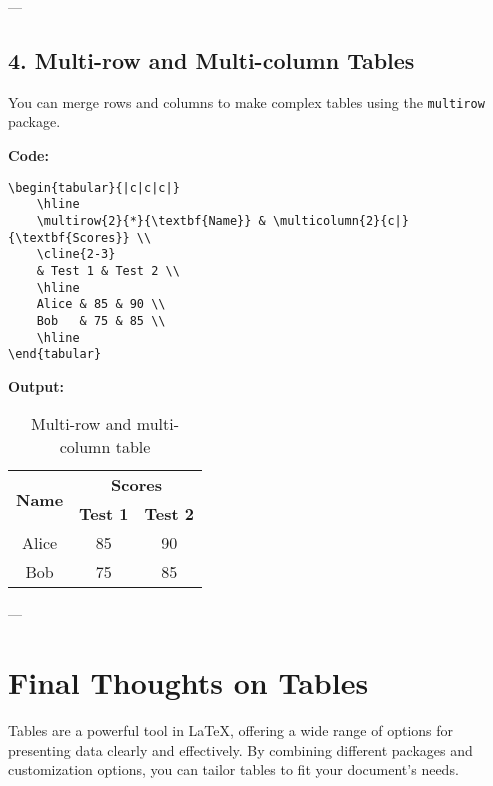 \documentclass{article}
\begin{document}
---

\subsection*{4. Multi-row and Multi-column Tables}

You can merge rows and columns to make complex tables using the \texttt{multirow} package.

\textbf{Code:}
\begin{verbatim}
\begin{tabular}{|c|c|c|}
    \hline
    \multirow{2}{*}{\textbf{Name}} & \multicolumn{2}{c|}{\textbf{Scores}} \\
    \cline{2-3}
    & Test 1 & Test 2 \\
    \hline
    Alice & 85 & 90 \\
    Bob   & 75 & 85 \\
    \hline
\end{tabular}
\end{verbatim}

\textbf{Output:}
\begin{table}[h]
    \centering
    \begin{tabular}{|c|c|c|}
        \hline
        \multirow{2}{*}{\textbf{Name}} & \multicolumn{2}{c|}{\textbf{Scores}} \\
        \cline{2-3}
                                       & \textbf{Test 1} & \textbf{Test 2} \\
        \hline
        Alice   & 85  & 90 \\
        Bob     & 75  & 85 \\
        \hline
    \end{tabular}
    \caption{Multi-row and multi-column table}
\end{table}

---

\section*{Final Thoughts on Tables}
Tables are a powerful tool in LaTeX, offering a wide range of options for presenting data clearly and effectively. By combining different packages and customization options, you can tailor tables to fit your document's needs.
\end{document}
